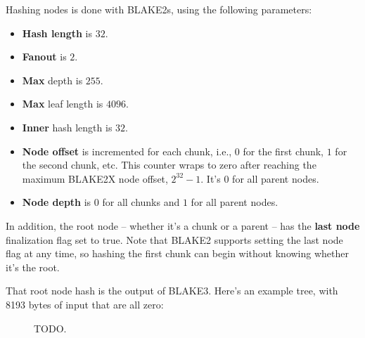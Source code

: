 \documentclass[11pt,notitlepage,a4paper]{article}
\begin{document}
Hashing nodes is done with BLAKE2s, using the following parameters:
\begin{itemize}
\item \textbf{Hash length} is $32$.
\item \textbf{Fanout} is $2$.
\item \textbf{Max} depth is $255$.
\item \textbf{Max} leaf length is $4096$.
\item \textbf{Inner} hash length is $32$.
\item \textbf{Node offset} is incremented for each chunk, i.e., $0$ for the first chunk, $1$ for the second chunk, etc. This counter wraps to zero after reaching the maximum BLAKE2X node offset, $2^{32}-1$. It's $0$ for all parent nodes.
\item \textbf{Node depth} is $0$ for all chunks and $1$ for all parent nodes.
\end{itemize}
In addition, the root node -- whether it's a chunk or a parent -- has the \textbf{last node} finalization flag set to true. Note that BLAKE2 supports setting the last node flag at any time, so hashing the first chunk can begin without knowing whether it's the root.

That root node hash is the output of BLAKE3. Here's an example tree, with 8193 bytes of input that are all zero:
\begin{figure}[h]
\centering
TODO.
\end{figure}
\end{document}

